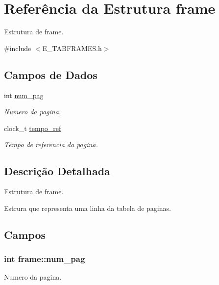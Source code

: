 \hypertarget{structframe}{}\section{Referência da Estrutura frame}
\label{structframe}


Estrutura de frame.  




{\ttfamily \#include $<$E\+\_\+\+T\+A\+B\+F\+R\+A\+M\+E\+S.\+h$>$}

\subsection*{Campos de Dados}
\begin{DoxyCompactItemize}
\item 
int \hyperlink{structframe_ae462046ba8fb021ba6ea5a1c51cb8259}{num\+\_\+pag}
\begin{DoxyCompactList}\small\item\em Numero da pagina. \end{DoxyCompactList}\item 
clock\+\_\+t \hyperlink{structframe_a0127826e370fe79cf83eb73d3c91672a}{tempo\+\_\+ref}
\begin{DoxyCompactList}\small\item\em Tempo de referencia da pagina. \end{DoxyCompactList}\end{DoxyCompactItemize}


\subsection{Descrição Detalhada}
Estrutura de frame. 

Estrura que representa uma linha da tabela de paginas. 

\subsection{Campos}
\hypertarget{structframe_ae462046ba8fb021ba6ea5a1c51cb8259}{}
\subsubsection[{num\+\_\+pag}]{\setlength{\rightskip}{0pt plus 5cm}int frame\+::num\+\_\+pag}\label{structframe_ae462046ba8fb021ba6ea5a1c51cb8259}


Numero da pagina. 

